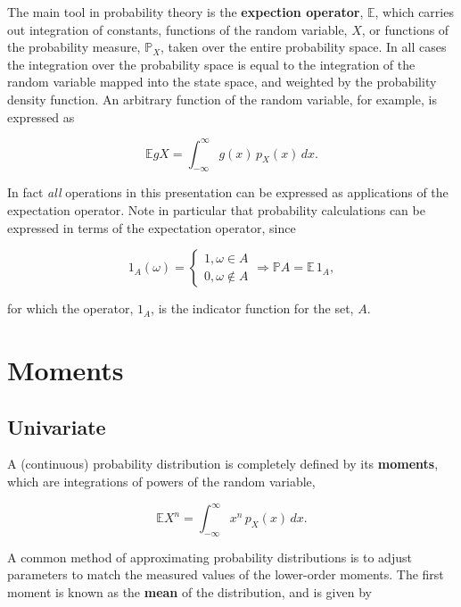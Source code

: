 \documentclass[12pt, twoside, draft]{article}
\begin{document}
The main tool in probability theory is the \textbf{expection operator}, $\mathbb{E}$, which carries out integration of  constants, functions of the random variable, $X$, or functions of the probability measure, $\mathbb{P}_X$, taken over the entire probability space.  In all cases the integration over the probability space is equal to the integration of the random variable mapped into the state space, and weighted by the probability density function.  An arbitrary function of the random variable, for example, is expressed as

\begin{equation}
\mathbb{E}gX = \int_{-\infty}^{\infty}g(x) \, p_X(x)\,dx.
\end{equation}

In fact \textit{all} operations in this presentation can be expressed as applications of the expectation operator.  Note in particular that probability calculations can be expressed in terms of the expectation operator, since

\begin{equation}
1_A(\omega) = \begin{cases}
1, \omega \in A \\
0, \omega \notin A 
\end{cases}
\Rightarrow
\mathbb{P}A = \mathbb{E}\,1_A,
\end{equation}

for which the operator, $1_A$, is the indicator function for the set, $A$.

\section{Moments}\label{sec:moments}
\subsection{Univariate}

A (continuous) probability distribution is completely defined by its \textbf{moments}, which are integrations of  powers of the random variable,

\begin{equation}
\mathbb{E}X^n = \int_{-\infty}^\infty x^n \, p_X(x)\,dx.
\end{equation}

A common method of approximating probability distributions is to adjust parameters to match the measured values of the lower-order moments.  The first moment is known as the \textbf{mean} of the distribution, and is given by 
\end{document}

